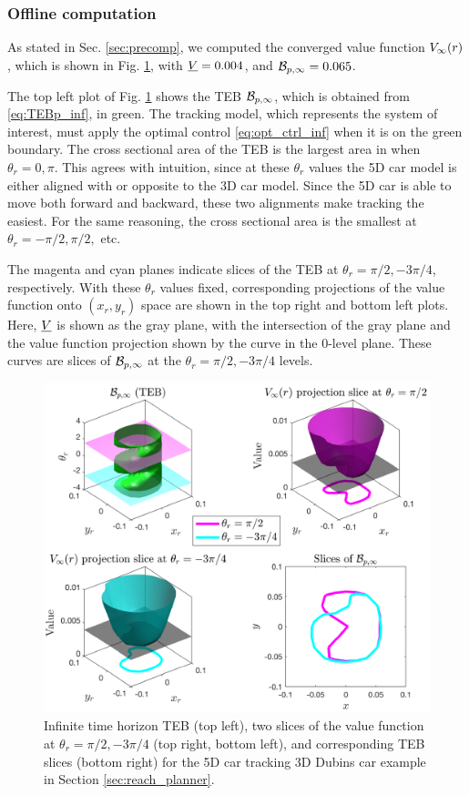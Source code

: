 \subsubsection{Offline computation}

As stated in Sec. \ref{sec:precomp}, we computed the converged value function $V_\infty(r)$, which is shown in Fig. \ref{fig:vf_TEB:5D3D}, with $\underline{V} = 0.004$, and $\mathcal B_{p, \infty} = 0.065$.

The top left plot of Fig. \ref{fig:vf_TEB:5D3D} shows the TEB $\mathcal B_{p, \infty}$, which is obtained from \eqref{eq:TEBp_inf}, in green.
The tracking model, which represents the system of interest, must apply the optimal control \eqref{eq:opt_ctrl_inf} when it is on the green boundary.
The cross sectional area of the TEB is the largest area in when $\theta_r = 0,\pi$. 
This agrees with intuition, since at these $\theta_r$ values the 5D car model is either aligned with or opposite to the 3D car model.
Since the 5D car is able to move both forward and backward, these two alignments make tracking the easiest.
For the same reasoning, the cross sectional area is the smallest at $\theta_r = -\pi/2, \pi/2,$ etc.

The magenta and cyan planes indicate slices of the TEB at $\theta_r = \pi/2, -3\pi/4$, respectively.
With these $\theta_r$ values fixed, corresponding projections of the value function onto $(x_r, y_r)$ space are shown in the top right and bottom left plots.
Here, $\underline{V}$ is shown as the gray plane, with the intersection of the gray plane and the value function projection shown by the curve in the $0$-level plane. 
These curves are slices of $\mathcal B_{p, \infty}$ at the $\theta_r = \pi/2, -3\pi/4$ levels.

\begin{figure}
	\includegraphics[width=\columnwidth]{fig/ti_valfunc_5d3d}
	\caption{Infinite time horizon TEB (top left), two slices of the value function at $\theta_r = \pi/2, -3\pi/4$ (top right, bottom left), and corresponding TEB slices (bottom right) for the 5D car tracking 3D Dubins car example in Section \ref{sec:reach_planner}.}
	\label{fig:vf_TEB:5D3D}  
\end{figure}

